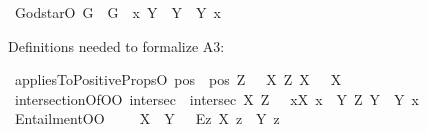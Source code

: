 \begin{isabellebody}
\isamarkupfalse%
\ God{\isacharunderscore}star{\isacharcolon}{\isacharcolon}{\isachardoublequoteopen}{\isasymup}{\isasymlangle}O{\isasymrangle}{\isachardoublequoteclose}\ {\isacharparenleft}{\isachardoublequoteopen}G{\isacharasterisk}{\isachardoublequoteclose}{\isacharparenright}\ \ {\isachardoublequoteopen}G{\isacharasterisk}\ {\isasymequiv}\ {\isacharparenleft}{\isasymlambda}x{\isachardot}\ \isactrlbold {\isasymforall}Y{\isachardot}\ {\isasymP}\ Y\ \isactrlbold {\isasymleftrightarrow}\ Y\ x{\isacharparenright}{\isachardoublequoteclose}%
\begin{isamarkuptext}%
Definitions needed to formalize A3:%
\end{isamarkuptext}\isamarkuptrue%
\isamarkupfalse%
\ appliesToPositiveProps{\isacharcolon}{\isacharcolon}{\isachardoublequoteopen}{\isasymup}{\isasymlangle}{\isasymup}{\isasymlangle}{\isasymup}{\isasymlangle}O{\isasymrangle}{\isasymrangle}{\isasymrangle}{\isachardoublequoteclose}\ {\isacharparenleft}{\isachardoublequoteopen}pos{\isachardoublequoteclose}{\isacharparenright}\ \ {\isachardoublequoteopen}pos\ Z\ {\isasymequiv}\ \ \isactrlbold {\isasymforall}X{\isachardot}\ Z\ X\ \isactrlbold {\isasymrightarrow}\ {\isasymP}\ X{\isachardoublequoteclose}\isanewline
{}\isamarkupfalse%
\ intersectionOf{\isacharcolon}{\isacharcolon}{\isachardoublequoteopen}{\isasymup}{\isasymlangle}{\isasymup}{\isasymlangle}O{\isasymrangle}{\isacharcomma}{\isasymup}{\isasymlangle}{\isasymup}{\isasymlangle}O{\isasymrangle}{\isasymrangle}{\isasymrangle}{\isachardoublequoteclose}\ {\isacharparenleft}{\isachardoublequoteopen}intersec{\isachardoublequoteclose}{\isacharparenright}\ \ {\isachardoublequoteopen}intersec\ X\ Z\ {\isasymequiv}\ \ \isactrlbold {\isasymbox}{\isacharparenleft}\isactrlbold {\isasymforall}x{\isachardot}{\isacharparenleft}X\ x\ \isactrlbold {\isasymleftrightarrow}\ {\isacharparenleft}\isactrlbold {\isasymforall}Y{\isachardot}\ {\isacharparenleft}Z\ Y{\isacharparenright}\ \isactrlbold {\isasymrightarrow}\ {\isacharparenleft}Y\ x{\isacharparenright}{\isacharparenright}{\isacharparenright}{\isacharparenright}{\isachardoublequoteclose}\ \isanewline
{}\isamarkupfalse%
\ Entailment{\isacharcolon}{\isacharcolon}{\isachardoublequoteopen}{\isasymup}{\isasymlangle}{\isasymup}{\isasymlangle}O{\isasymrangle}{\isacharcomma}{\isasymup}{\isasymlangle}O{\isasymrangle}{\isasymrangle}{\isachardoublequoteclose}\ {\isacharparenleft}\ {\isachardoublequoteopen}{\isasymRrightarrow}{\isachardoublequoteclose}\ {}{}{\isacharparenright}\ \ {\isachardoublequoteopen}X\ {\isasymRrightarrow}\ Y\ {\isasymequiv}\ \ \isactrlbold {\isasymbox}{\isacharparenleft}\isactrlbold {\isasymforall}\isactrlsup Ez{\isachardot}\ X\ z\ \isactrlbold {\isasymrightarrow}\ Y\ z{\isacharparenright}{\isachardoublequoteclose}%

\end{isabellebody}
